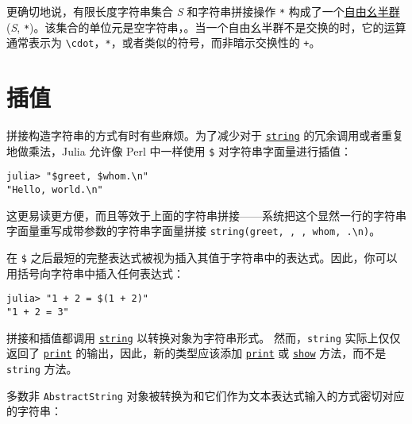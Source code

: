 更确切地说，有限长度字符串集合 \emph{S} 和字符串拼接操作 \texttt{*} 构成了一个\href{https://en.wikipedia.org/wiki/Free\_monoid}{自由幺半群} (\emph{S}, \texttt{*})。该集合的单位元是空字符串，\texttt{{\textquotedbl}{\textquotedbl}}。当一个自由幺半群不是交换的时，它的运算通常表示为 \texttt{{\textbackslash}cdot}，\texttt{*}，或者类似的符号，而非暗示交换性的 \texttt{+}。



\hypertarget{12583298261221600612}{}


\section{插值}



拼接构造字符串的方式有时有些麻烦。为了减少对于 \hyperlink{7919678712989769360}{\texttt{string}} 的冗余调用或者重复地做乘法，Julia 允许像 Perl 中一样使用 \texttt{\$} 对字符串字面量进行插值：




\begin{verbatim}
julia> "$greet, $whom.\n"
"Hello, world.\n"
\end{verbatim}



这更易读更方便，而且等效于上面的字符串拼接——系统把这个显然一行的字符串字面量重写成带参数的字符串字面量拼接 \texttt{string(greet, {\textquotedbl}, {\textquotedbl}, whom, {\textquotedbl}.{\textbackslash}n{\textquotedbl})}。



在 \texttt{\$} 之后最短的完整表达式被视为插入其值于字符串中的表达式。因此，你可以用括号向字符串中插入任何表达式：




\begin{verbatim}
julia> "1 + 2 = $(1 + 2)"
"1 + 2 = 3"
\end{verbatim}



拼接和插值都调用 \hyperlink{7919678712989769360}{\texttt{string}} 以转换对象为字符串形式。 然而，\texttt{string} 实际上仅仅返回了 \hyperlink{8248717042415202230}{\texttt{print}} 的输出，因此，新的类型应该添加 \hyperlink{8248717042415202230}{\texttt{print}} 或 \hyperlink{4561869563484222675}{\texttt{show}} 方法，而不是 \texttt{string} 方法。



多数非 \texttt{AbstractString} 对象被转换为和它们作为文本表达式输入的方式密切对应的字符串：




